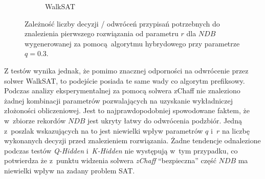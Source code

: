 \begin{figure}[!htb]
\begin{subfigure}{0.5\textwidth}
        \caption{WalkSAT}
        \label{chrt:r-hybrid-w}
    \end{subfigure}
    \caption{Zależność liczby decyzji / odwróceń przypisań potrzebnych do znalezienia pierwszego rozwiązania od parametru $r$ dla $NDB$ wygenerowanej za pomocą algorytmu hybrydowego przy parametrze $q=0.3$.}
\end{figure}

Z testów wynika jednak, że pomimo znacznej odporności na odwrócenie przez solwer WalkSAT, to podejście posiada te same wady co algorytm prefiksowy. Podczas analizy eksperymentalnej za pomocą solwera zChaff
nie znaleziono żadnej kombinacji parametrów pozwalających na uzyskanie wykładniczej złożoności obliczeniowej. Jest to najprawdopodobniej spowodowane faktem, że w~zbiorze rekordów $NDB$ jest ukryty łatwy do odwrócenia podzbiór.
Jedną z~poszlak wskazujących na to jest niewielki wpływ parametrów $q$ i~$r$ na liczbę wykonanych decyzji przed znalezieniem rozwiązania. Żadne tendencje odnalezione podczas testów \textit{Q-Hidden} i~\textit{K-Hidden} 
nie występują w~tym przypadku, co potwierdza że z~punktu widzenia solwera \textit{zChaff} \enquote{bezpieczna} część $NDB$ ma niewielki wpływ na zadany problem SAT. 

